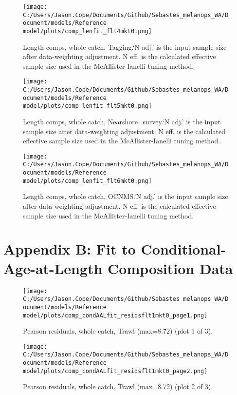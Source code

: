 \documentclass[11pt,
  english,
  letterpaper,
]{article}
\begin{document}
\begin{figure}
\centering
\texttt{[image: C:/Users/Jason.Cope/Documents/Github/Sebastes\_melanops\_WA/Document/models/Reference model/plots/comp\_lenfit\_flt4mkt0.png]}
\caption{Length comps, whole catch, Tagging.`N adj.' is the input sample size after data-weighting adjustment. N eff. is the calculated effective sample size used in the McAllister-Ianelli tuning method.\label{fig:comp_lenfit_flt4mkt0}}
\end{figure}

\begin{figure}
\centering
\texttt{[image: C:/Users/Jason.Cope/Documents/Github/Sebastes\_melanops\_WA/Document/models/Reference model/plots/comp\_lenfit\_flt5mkt0.png]}
\caption{Length comps, whole catch, Nearshore\_survey.`N adj.' is the input sample size after data-weighting adjustment. N eff. is the calculated effective sample size used in the McAllister-Ianelli tuning method.\label{fig:comp_lenfit_flt5mkt0}}
\end{figure}

\begin{figure}
\centering
\texttt{[image: C:/Users/Jason.Cope/Documents/Github/Sebastes\_melanops\_WA/Document/models/Reference model/plots/comp\_lenfit\_flt6mkt0.png]}
\caption{Length comps, whole catch, OCNMS.`N adj.' is the input sample size after data-weighting adjustment. N eff. is the calculated effective sample size used in the McAllister-Ianelli tuning method.\label{fig:comp_lenfit_flt6mkt0}}
\end{figure}

\clearpage

\hypertarget{app-b}{%
\section{Appendix B: Fit to Conditional-Age-at-Length Composition Data}\label{app-b}}

\begin{figure}
\centering
\texttt{[image: C:/Users/Jason.Cope/Documents/Github/Sebastes\_melanops\_WA/Document/models/Reference model/plots/comp\_condAALfit\_residsflt1mkt0\_page1.png]}
\caption{Pearson residuals, whole catch, Trawl (max=8.72) (plot 1 of 3).\label{fig:comp_condAALfit_residsflt1mkt0_page1}}
\end{figure}

\begin{figure}
\centering
\texttt{[image: C:/Users/Jason.Cope/Documents/Github/Sebastes\_melanops\_WA/Document/models/Reference model/plots/comp\_condAALfit\_residsflt1mkt0\_page2.png]}
\caption{Pearson residuals, whole catch, Trawl (max=8.72) (plot 2 of 3).\label{fig:comp_condAALfit_residsflt1mkt0_page2}}
\end{figure}
\end{document}
